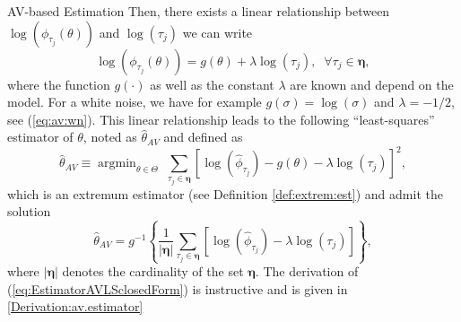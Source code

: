 \documentclass[envcountsect,usenames,dvipsnames]{beamer}
\DeclareMathOperator*{\argmin}{argmin}
\theoremstyle{mystyle}
\begin{document}
\begin{frame}{AV-based Estimation}
  \small 
Then, there exists a linear relationship between $\log \left( \phi_{\tau_j} ({\theta}) \right)$ and $\log\left( \tau_j \right)$ we can write
%
\begin{equation}
	\log \left( {\phi}_{\tau_j} \left( {\theta} \right) \right) = g\left( \theta \right) + \lambda \log \left( \tau_j \right), \;\;  \forall\tau_j \in \bm{\eta},
	\label{eq:AVmodelTHEO}
\end{equation}
%
where the function $g (\cdot)$ as well as the constant $\lambda$ are known and depend on the model. For a white noise, we have for example $g(\sigma) = \log(\sigma)$ and $\lambda = -1/2$, see (\ref{eq:av:wn}). This linear relationship leads to the following ``least-squares'' estimator of $\theta$, noted as $\hat{\theta}_{AV}$ and defined as
%
\begin{equation}
    \hat{\theta}_{AV} \equiv \argmin_{\theta \in \Theta} \; \sum_{\tau_j \in \bm{\eta}}\left[ 	\log \left( \hat{\phi}_{\tau_j} \right) - g\left( \theta \right) - \lambda \log \left( \tau_j \right) \right]^2,
    \label{eq:avlr}
\end{equation}
%
which is an extremum estimator (see Definition \ref{def:extrem:est}) and admit the solution
%
\begin{equation}
	\hat{\theta}_{AV} = g^{-1} \left\{\frac{1}{| \bm{\eta}|} \sum_{\tau_j \in \bm{\eta}} \left[ \log \left( \hat{\phi}_{\tau_j}  \right) - \lambda \log \left( \tau_j \right)\right]\right\} ,
	\label{eq:EstimatorAVLSclosedForm}
\end{equation}
%
where $| \bm{\eta}|$ denotes the cardinality of the set $\bm{\eta}$. The derivation of (\ref{eq:EstimatorAVLSclosedForm}) is instructive and is given in \ref{Derivation:av.estimator} $\;$
\hyperlink{proof:lemma:asy:av}{}
\end{frame}
\end{document}
